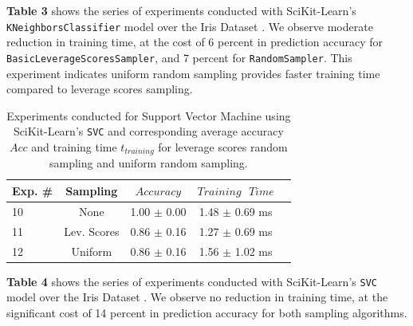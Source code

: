 \documentclass{article}
\theoremstyle{plain}
\theoremstyle{definition}
\theoremstyle{remark}
\begin{document}
\textbf{Table 3} shows the series of experiments conducted with SciKit-Learn's \texttt{KNeighborsClassifier} model over the Iris Dataset \cite{iris}. We observe moderate reduction in training time, at the cost of 6 percent in prediction accuracy for \texttt{BasicLeverageScoresSampler}, and 7 percent for \texttt{RandomSampler}. This experiment indicates uniform random sampling provides faster training time compared to leverage scores sampling.

\begin{table}[t]
	\caption{Experiments conducted for Support Vector Machine using SciKit-Learn's \texttt{SVC} and corresponding average accuracy $Acc$ and training time $t_{training}$ for leverage scores random sampling and uniform random sampling.}
	\label{t4}
	\vskip 0.15in
	\begin{center}
		\begin{small}
			\begin{sc}
				\begin{tabular}{lcccr}
					\toprule
					Exp. \# & Sampling & $Accuracy$ & $Training \text{ } Time$\\
					\midrule
					10 & None & 1.00 $\pm$ 0.00 & 1.48 $\pm$ 0.69 ms \\
					11 & Lev. Scores & 0.86 $\pm$ 0.16 & 1.27 $\pm$ 0.69 ms \\
					12 & Uniform & 0.86 $\pm$ 0.16 & 1.56 $\pm$ 1.02 ms \\
					\bottomrule
				\end{tabular}
			\end{sc}
		\end{small}
	\end{center}
	\vskip -0.1in
\end{table}

\textbf{Table 4} shows the series of experiments conducted with SciKit-Learn's \texttt{SVC} model over the Iris Dataset \cite{iris}. We observe no reduction in training time, at the significant cost of 14 percent in prediction accuracy for both sampling algorithms.
\end{document}

